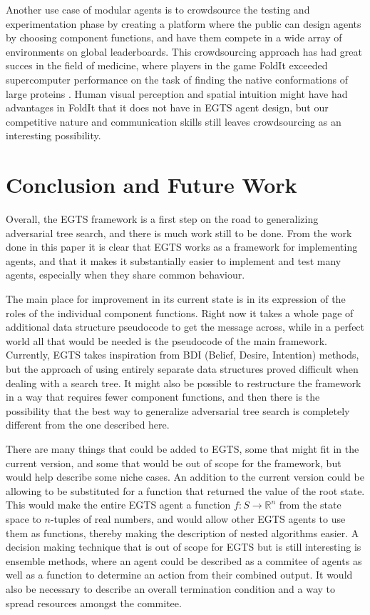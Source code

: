 Another use case of modular agents is to crowdsource the testing and experimentation phase by creating a platform where the public can design agents by choosing component functions, and have them compete in a wide array of environments on global leaderboards. This crowdsourcing approach has had great succes in the field of medicine, where players in the game FoldIt exceeded supercomputer performance on the task of finding the native conformations of large proteins \cite{Cooper2010}. Human visual perception and spatial intuition might have had advantages in FoldIt that it does not have in EGTS agent design, but our competitive nature and communication skills still leaves crowdsourcing as an interesting possibility.

\newpage
\section{Conclusion and Future Work}

Overall, the EGTS framework is a first step on the road to generalizing adversarial tree search, and there is much work still to be done. From the work done in this paper it is clear that EGTS works as a framework for implementing agents, and that it makes it substantially easier to implement and test many agents, especially when they share common behaviour.

The main place for improvement in its current state is in its expression of the roles of the individual component functions. Right now it takes a whole page of additional data structure pseudocode to get the message across, while in a perfect world all that would be needed is the pseudocode of the main framework. Currently, EGTS takes inspiration from BDI (Belief, Desire, Intention) methods, but the approach of using entirely separate data structures proved difficult when dealing with a search tree. It might also be possible to restructure the framework in a way that requires fewer component functions, and then there is the possibility that the best way to generalize adversarial tree search is completely different from the one described here.

There are many things that could be added to EGTS, some that might fit in the current version, and some that would be out of scope for the framework, but would help describe some niche cases. An addition to the current version could be allowing \gbm to be substituted for a  function that returned the value of the root state. This would make the entire EGTS agent a function $f:S \to \mathbb{R}^n$ from the state space to $n$-tuples of real numbers, and would allow other EGTS agents to use them as \eval functions, thereby making the description of nested algorithms easier. A decision making technique that is out of scope for EGTS but is still interesting is ensemble methods, where an agent could be described as a commitee of agents as well as a function to determine an action from their combined output. It would also be necessary to describe an overall termination condition and a way to spread resources amongst the commitee.

